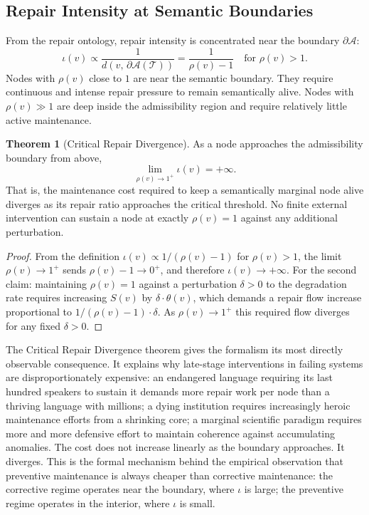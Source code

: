 \documentclass[11pt, a4paper]{article}
\theoremstyle{definition}
\newtheorem{theorem}{Theorem}
\theoremstyle{remark}
\begin{document}
\subsection{Repair Intensity at Semantic Boundaries}

From the repair ontology, repair intensity is concentrated near the boundary
$\partial\mathcal{A}$:
\[
\iota(v) \propto \frac{1}{d(v,\, \partial\mathcal{A}(\mathcal{T}))} = \frac{1}{\rho(v) - 1}
\quad \text{for } \rho(v) > 1.
\]
Nodes with $\rho(v)$ close to $1$ are near the semantic boundary. They require
continuous and intense repair pressure to remain semantically alive. Nodes with
$\rho(v) \gg 1$ are deep inside the admissibility region and require relatively
little active maintenance.

\begin{theorem}[Critical Repair Divergence]
As a node approaches the admissibility boundary from above,
\[
\lim_{\rho(v) \to 1^+} \iota(v) = +\infty.
\]
That is, the maintenance cost required to keep a semantically marginal node alive
diverges as its repair ratio approaches the critical threshold. No finite
external intervention can sustain a node at exactly $\rho(v) = 1$ against any
additional perturbation.
\end{theorem}

\begin{proof}
From the definition $\iota(v) \propto 1/(\rho(v) - 1)$ for $\rho(v) > 1$,
the limit $\rho(v) \to 1^+$ sends $\rho(v) - 1 \to 0^+$, and therefore
$\iota(v) \to +\infty$. For the second claim: maintaining $\rho(v) = 1$
against a perturbation $\delta > 0$ to the degradation rate requires increasing
$S(v)$ by $\delta \cdot \theta(v)$, which demands a repair flow increase
proportional to $1/(\rho(v)-1) \cdot \delta$. As $\rho(v) \to 1^+$ this
required flow diverges for any fixed $\delta > 0$.
\end{proof}

The Critical Repair Divergence theorem gives the formalism its most directly
observable consequence. It explains why late-stage interventions in failing
systems are disproportionately expensive: an endangered language requiring its
last hundred speakers to sustain it demands more repair work per node than
a thriving language with millions; a dying institution requires increasingly
heroic maintenance efforts from a shrinking core; a marginal scientific paradigm
requires more and more defensive effort to maintain coherence against accumulating
anomalies. The cost does not increase linearly as the boundary approaches. It
diverges. This is the formal mechanism behind the empirical observation that
preventive maintenance is always cheaper than corrective maintenance: the
corrective regime operates near the boundary, where $\iota$ is large; the
preventive regime operates in the interior, where $\iota$ is small.
\end{document}
